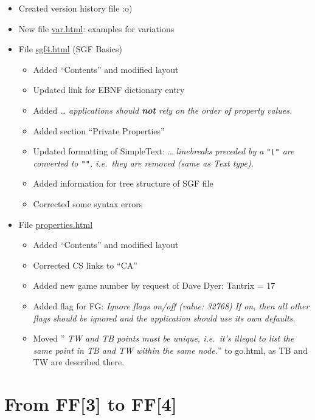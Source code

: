 \begin{itemize}
\item
  Created version history file :o)
\item
  New file \href{https://red-bean.com/sgf/var.html}{var.html}: examples
  for variations
\item
  File \href{https://red-bean.com/sgf/sgf4.html}{sgf4.html} (SGF Basics)

  \begin{itemize}
  \item
    Added ``Contents'' and modified layout
  \item
    Updated link for EBNF dictionary entry
  \item
    Added \ldots{} \emph{applications should \textbf{not} rely on the
    order of property} \emph{values.}
  \item
    Added section ``Private Properties''
  \item
    Updated formatting of SimpleText: \ldots{} \emph{linebreaks preceded
    by a} \emph{\texttt{"\textbackslash{}"} are converted to
    \texttt{""}, i.e.~they are removed} \emph{(same as Text type).}
  \item
    Added information for tree structure of SGF file
  \item
    Corrected some syntax errors
  \end{itemize}
\item
  File \href{https://red-bean.com/sgf/properties.html}{properties.html}

  \begin{itemize}
  \item
    Added ``Contents'' and modified layout
  \item
    Corrected CS links to ``CA''
  \item
    Added new game number by request of Dave Dyer: Tantrix = 17
  \item
    Added flag for FG: \emph{Ignore flags on/off (value: 32768)}
    \emph{If on, then all other flags should be ignored and} \emph{the
    application should use its own defaults.}
  \item
    Moved '' \emph{TW and TB points must be unique, i.e.~it's illegal to
    list the} \emph{same point in TB and TW within the same node.}'' to
    go.html, as TB and TW are described there.
  \end{itemize}
\end{itemize}

\newpage

\section{From FF{[}3{]} to FF{[}4{]}}\label{from-ff3-to-ff4}

